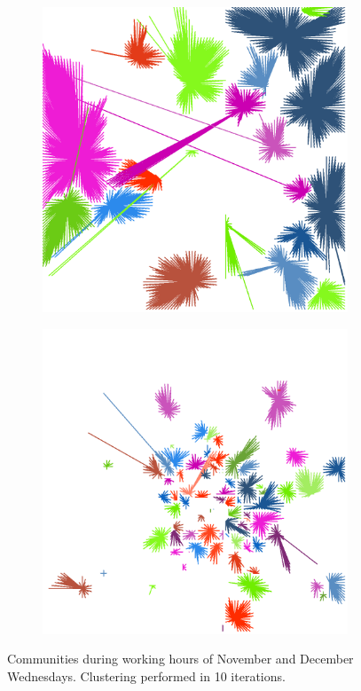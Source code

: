 \documentclass[12pt,a4paper]{article}
\begin{document}
\begin{figure}[H]
\begin{subfigure}[b]{0.3\textwidth}
\end{subfigure}
\begin{subfigure}[b]{0.3\textwidth}
\includegraphics[width=\textwidth]{weekDef/edges-3Wed-mid.png}
\end{subfigure}
\begin{subfigure}[b]{0.3\textwidth}
\includegraphics[width=\textwidth]{weekDef/edges-3Wed-small.png}
\end{subfigure}
\caption{Communities during working hours of November and December Wednesdays. Clustering performed in 10 iterations.}
\label{fig:wednesdayworking}
\end{figure}
\end{document}

